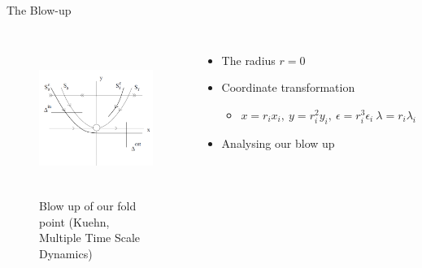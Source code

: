 \documentclass[11pt]{beamer}
\begin{document}
\begin{frame}{The Blow-up}
\begin{columns}
\begin{figure}
    \centering
    \includegraphics[height=5cm, width=5cm]{Blow_up.png}
    \caption{Blow up of our fold point (Kuehn, Multiple Time Scale Dynamics)}
\end{figure}

\begin{itemize}

\item The radius $r=0$
\item Coordinate transformation
\begin{itemize}
    \item $x=r_ix_i, \ y=r_i^2y_i, \ \epsilon=r_i^3\epsilon_i \ \lambda=r_i\lambda_i$\\
\end{itemize}
\item Analysing our blow up
\end{itemize}
\end{columns}
\end{frame}
\end{document}
